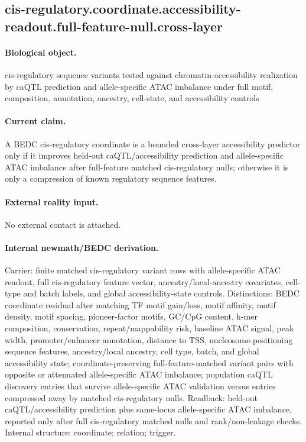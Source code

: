 \subsection{cis-regulatory.coordinate.accessibility-readout.full-feature-null.cross-layer}

\paragraph{Biological object.} cis-regulatory sequence variants tested against chromatin-accessibility realization by caQTL prediction and allele-specific ATAC imbalance under full motif, composition, annotation, ancestry, cell-state, and accessibility controls

\paragraph{Current claim.} A BEDC cis-regulatory coordinate is a bounded cross-layer accessibility predictor only if it improves held-out caQTL/accessibility prediction and allele-specific ATAC imbalance after full-feature matched cis-regulatory nulls; otherwise it is only a compression of known regulatory sequence features.

\paragraph{External reality input.}
No external contact is attached.

\paragraph{Internal newmath/BEDC derivation.} Carrier: finite matched cis-regulatory variant rows with allele-specific ATAC readout, full cis-regulatory feature vector, ancestry/local-ancestry covariates, cell-type and batch labels, and global accessibility-state controls. Distinctions: BEDC coordinate residual after matching TF motif gain/loss, motif affinity, motif density, motif spacing, pioneer-factor motifs, GC/CpG content, k-mer composition, conservation, repeat/mappability risk, baseline ATAC signal, peak width, promoter/enhancer annotation, distance to TSS, nucleosome-positioning sequence features, ancestry/local ancestry, cell type, batch, and global accessibility state; coordinate-preserving full-feature-matched variant pairs with opposite or attenuated allele-specific ATAC imbalance; population caQTL discovery entries that survive allele-specific ATAC validation versus entries compressed away by matched cis-regulatory nulls. Readback: held-out caQTL/accessibility prediction plus same-locus allele-specific ATAC imbalance, reported only after full cis-regulatory matched nulls and rank/non-leakage checks. Internal structure: coordinate; relation; trigger.

